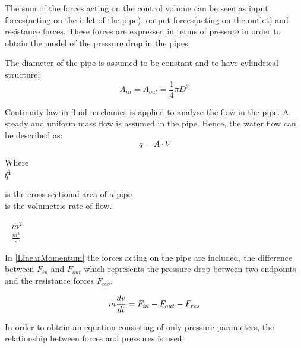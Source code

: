 The sum of the forces acting on the control volume can be seen as input forces(acting on the inlet of the pipe), output forces(acting on the outlet) and resistance forces.  
These forces are expressed in terms of pressure in order to obtain the model of the pressure drop in the pipes. 

The diameter of the pipe is assumed to be constant and to have cylindrical structure:
\begin{equation}
  A_{in} = A_{out} = \frac{1}{4}\pi D^{2}
\end{equation}

Continuity law in fluid mechanics is applied to analyse the flow in the pipe.\cite{Hunt_Fluidmechanics} A steady and uniform mass flow is assumed in the pipe. Hence, the water flow can be described as: 
\begin{equation}
  q=A \cdot V
	\label{EquationOfContinuity}
\end{equation}

 \begin{minipage}[t]{0.20\textwidth}
Where\\
\hspace*{8mm} $A$ \\
\hspace*{8mm} $q$ 
\end{minipage}
\begin{minipage}[t]{0.68\textwidth}
\vspace*{2mm}
is the cross sectional area of a pipe\\
is the volumetric rate of flow.

\end{minipage}
\begin{minipage}[t]{0.10\textwidth}
\vspace*{2mm}
\textcolor{White}{te}$\unit{m^{2}}$\\
\textcolor{White}{te}$\unit{\frac{m^{3}}{s}}$
\end{minipage}

 In \eqref{LinearMomentum} the forces acting on the pipe are included, the difference between $F_{in}$ and $F_{out}$ which represents the pressure drop 
 between two endpoints and the resistance forces $F_{res}$.

\begin{equation}
  m \frac{dv}{dt} = F_{in} - F_{out} - F_{res} \\
  \label{LinearMomentum}
\end{equation}

In order to obtain an equation consisting of only pressure parameters, the relationship between forces and pressures is used.


